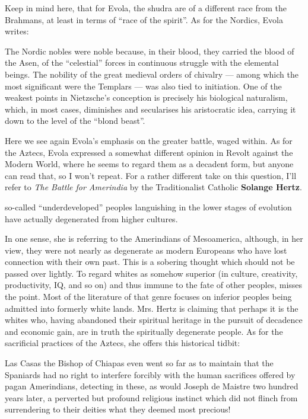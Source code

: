 Keep in mind here, that for Evola, the shudra are of a different race from the Brahmans, at least in terms of ``race of the spirit''. As for the Nordics, Evola writes:

\begin{quotex}
The Nordic nobles were noble because, in their blood, they carried the blood of the Asen, of the ``celestial'' forces in continuous struggle with the elemental beings. The nobility of the great medieval orders of chivalry --- among which the most significant were the Templars --- was also tied to initiation. One of the weakest points in Nietzsche's conception is precisely his biological naturalism, which, in most cases, diminishes and secularises his aristocratic idea, carrying it down to the level of the ``blond beast''.
\end{quotex}


Here we see again Evola's emphasis on the greater battle, waged within. As for the Aztecs, Evola expressed a somewhat different opinion in Revolt against the Modern World, where he seems to regard them as a decadent form, but anyone can read that, so I won't repeat. For a rather different take on this question, I'll refer to \textit{The Battle for Amerindia} by the Traditionalist Catholic \textbf{Solange Hertz}.

\begin{quotex}
so-called ``underdeveloped'' peoples languishing in the lower stages of evolution have actually degenerated from higher cultures.
\end{quotex}


In one sense, she is referring to the Amerindians of Mesoamerica, although, in her view, they were not nearly as degenerate as modern Europeans who have lost connection with their own past. This is a sobering thought which should not be passed over lightly. To regard whites as somehow superior (in culture, creativity, productivity, IQ, and so on) and thus immune to the fate of other peoples, misses the point. Most of the literature of that genre focuses on inferior peoples being admitted into formerly white lands. Mrs. Hertz is claiming that perhaps it is the whites who, having abandoned their spiritual heritage in the pursuit of decadence and economic gain, are in truth the spiritually degenerate people. As for the sacrificial practices of the Aztecs, she offers this historical tidbit:

\begin{quotex}
Las Casas the Bishop of Chiapas even went so far as to maintain that the Spaniards had no right to interfere forcibly with the human sacrifices offered by pagan Amerindians, detecting in these, as would Joseph de Maistre two hundred years later, a perverted but profound religious instinct which did not flinch from surrendering to their deities what they deemed most precious!
\end{quotex}


